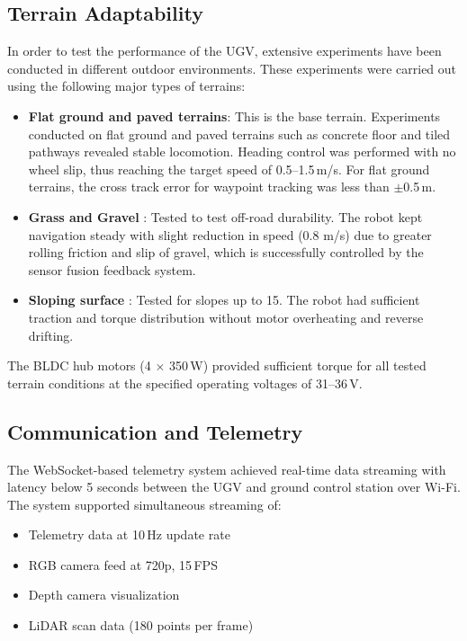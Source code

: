 \documentclass[runningheads]{llncs}
\begin{document}
\subsection{Terrain Adaptability}

In order to test the performance of the UGV, extensive experiments have been conducted in different outdoor environments. These experiments were carried out using the following major types of terrains:
\begin{itemize}\setlength{\itemsep}{0.2ex}\parskip0pt
    \item \textbf{Flat ground and paved terrains}: This is the base terrain. Experiments conducted on flat ground and paved terrains such as concrete floor and tiled pathways revealed stable locomotion. Heading control was performed with no wheel slip, thus reaching the target speed of 0.5--1.5\,m/s. For flat ground terrains, the cross track error for waypoint tracking was less than $\pm$0.5\,m.
\item \textbf{Grass and Gravel} : Tested to test off-road durability. The robot kept navigation steady with slight reduction in speed (0.8 m/s) due to greater rolling friction and slip of gravel, which is successfully controlled by the sensor fusion feedback system.
    \item \textbf{Sloping surface} : Tested for slopes up to 15\textdegree. The robot had sufficient traction and torque distribution without motor overheating and reverse drifting.
\end{itemize}

The BLDC hub motors (4 $\times$ 350\,W) provided sufficient torque for all tested terrain conditions at the specified operating voltages of 31--36\,V.

\subsection{Communication and Telemetry}

The WebSocket-based telemetry system achieved real-time data streaming with latency below 5 seconds between the UGV and ground control station over Wi-Fi. The system supported simultaneous streaming of:
\begin{itemize}\setlength{\itemsep}{0.2ex}\parskip0pt
    \item Telemetry data at 10\,Hz update rate
    \item RGB camera feed at 720p, 15\,FPS
    \item Depth camera visualization
    \item LiDAR scan data (180 points per frame)
\end{itemize}
\end{document}
